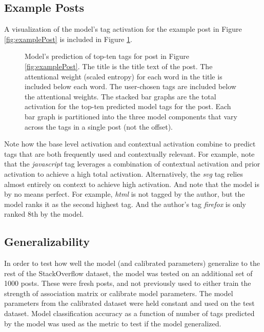 \documentclass[10pt,letterpaper]{article}
\begin{document}
\subsection{Example Posts}

A visualization of the model's tag activation for the example post in Figure \ref{fig:examplePost} is included in Figure \ref{fig:modelPost}.

\begin{figure}[ht]
  \centering
  \caption{
    Model's prediction of top-ten tags for post in Figure \ref{fig:examplePost}.
    The title is the title text of the post.
    The attentional weight (scaled entropy) for each word in the title is included below each word.
    The user-chosen tags are included below the attentional weights.
    The stacked bar graphs are the total activation for the top-ten predicted model tags for the post.
    Each bar graph is partitioned into the three model components that vary across the tags in a single post (not the offset).
}
  \label{fig:modelPost}
\end{figure}

Note how the base level activation and contextual activation combine to predict tags that are both frequently used and contextually relevant.
For example, note that the \emph{javascript} tag leverages a combination of contextual activation and prior activation to achieve a high total activation.
Alternatively, the \emph{svg} tag relies almost entirely on context to achieve high activation.
And note that the model is by no means perfect.
For example, \emph{html} is not tagged by the author, but the model ranks it as the second highest tag.
And the author's tag \emph{firefox} is only ranked 8th by the model.

\subsection{Generalizability}

In order to test how well the model (and calibrated parameters) generalize to the rest of the StackOverflow dataset, the model was tested on an additional set of \num{1000} posts.
These were fresh posts, and not previously used to either train the strength of association matrix or calibrate model parameters.
The model parameters from the calibrated dataset were held constant and used on the test dataset.
Model classification accuracy as a function of number of tags predicted by the model was used as the metric to test if the model generalized.
\end{document}
